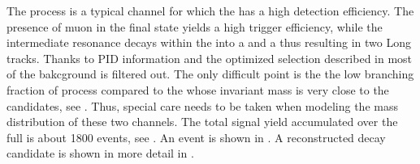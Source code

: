 The \BsJpsiKst process is a typical channel for which the \lhcb has a high detection efficiency.
The presence of muon in the final state yields a high trigger efficiency, while the intermediate
\Kstar resonance decays within the \velo into a \kaon and a \pion thus resulting in two Long tracks.
Thanks to PID information and the optimized selection described in  most of the bakcground
is filtered out. The only difficult point is the the low branching fraction of \BsJpsiKst process
compared to the \BdJpsiKst whose invariant mass is very close to the \BsJpsiKst candidates, see .
Thus, special care needs to be taken when modeling the mass distribution of these two channels.
The total \BsJpsiKst signal yield accumulated over the full \runone is about 1800 events, see .
An \lhcb event is shown in . A reconstructed \BsJpsiKst decay candidate is shown in
more detail in .

